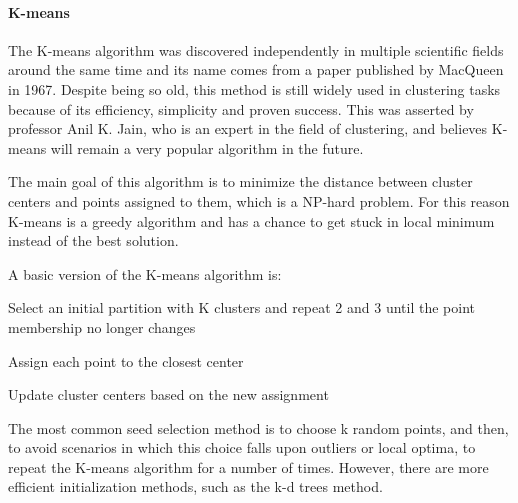 \documentclass[12pt]{article}
\begin{document}
	\paragraph{K-means}
	The K-means algorithm was discovered independently in multiple scientific fields around the same time and its name comes from a paper published by MacQueen in 1967\cite{DataClustering50yearsBeyondKmeans}. Despite being so old, this method is still widely used in clustering tasks because of its efficiency, simplicity and proven success. This was asserted by professor Anil K. Jain, who is an expert in the field of clustering, and believes K-means will remain a very popular algorithm in the future.
	
	The main goal of this algorithm is to minimize the distance between cluster centers and points assigned to them, which is a NP-hard problem. For this reason K-means is a greedy algorithm and has a chance to get stuck in local minimum instead of the best solution\cite{DataClustering50yearsBeyondKmeans}.
	
	A basic version of the K-means algorithm is\cite{AlgorithmsForClusteringData}:
	\begin{compactenum}
		\item Select an initial partition with K clusters and repeat 2 and 3 until the point membership no longer changes
		\item Assign each point to the closest center
		\item Update cluster centers based on the new assignment
	\end{compactenum}

	The most common seed selection method is to choose k random points, and then, to avoid scenarios in which this choice falls upon outliers or local optima, to repeat the K-means algorithm for a number of times. However, there are more efficient initialization methods, such as the k-d trees method.
	
\end{document}
